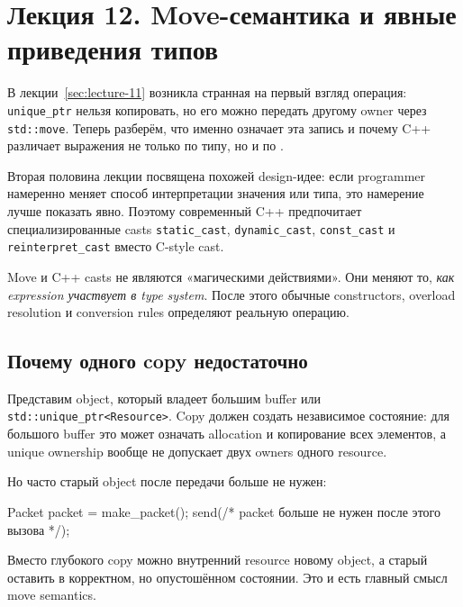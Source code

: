 \section{Лекция 12. Move-семантика и явные приведения типов}
\label{sec:lecture-12}

В лекции~\ref{sec:lecture-11} возникла странная на первый взгляд операция:
\texttt{unique\_ptr} нельзя копировать, но его можно передать другому owner через
\texttt{std::move}. Теперь разберём, что именно означает эта запись и почему
C++ различает выражения не только по типу, но и по .

Вторая половина лекции посвящена похожей design-идее: если programmer намеренно
меняет способ интерпретации значения или типа, это намерение лучше показать
явно. Поэтому современный C++ предпочитает специализированные casts
\texttt{static\_cast}, \texttt{dynamic\_cast}, \texttt{const\_cast} и
\texttt{reinterpret\_cast} вместо C-style cast.

\begin{importantbox}
Move и C++ casts не являются «магическими действиями».
Они меняют то, \emph{как expression участвует в type system}.
После этого обычные constructors, overload resolution и conversion rules
определяют реальную операцию.
\end{importantbox}

\subsection{Почему одного copy недостаточно}

Представим object, который владеет большим buffer или
\texttt{std::unique\_ptr<Resource>}. Copy должен создать независимое состояние:
для большого buffer это может означать allocation и копирование всех элементов,
а unique ownership вообще не допускает двух owners одного resource.

Но часто старый object после передачи больше не нужен:

\begin{cppcode}
Packet packet = make_packet();
send(/* packet больше не нужен после этого вызова */);
\end{cppcode}

Вместо глубокого copy можно  внутренний resource новому object,
а старый оставить в корректном, но опустошённом состоянии. Это и есть главный
смысл move semantics.

